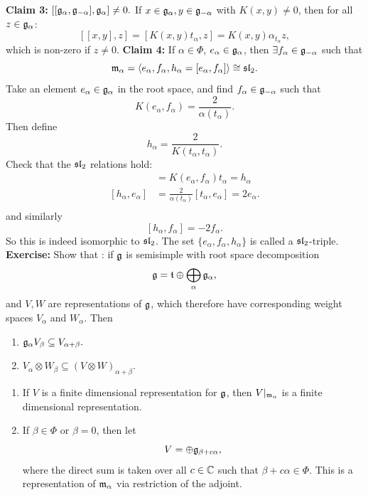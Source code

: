 \documentclass{article}
\begin{document}
\textbf{Claim 3:} $[[\mathfrak{g}_{\alpha},\mathfrak{g}_{-\alpha}],\mathfrak{g}_{\alpha}] \neq 0.$ \gap 
If $x \in \mathfrak{g}_{\alpha}, y \in \mathfrak{g}_{-\alpha}$ with $K(x,y) \neq 0$, then for all $z \in \mathfrak{g}_{\alpha}$: \[ [[x,y],z] = [K(x,y)t_{\alpha},z] = K(x,y)\alpha_{t_{\alpha}}z, \] which is non-zero if $z \neq 0$.\gap
\textbf{Claim 4: } \newlec If $\alpha \in \Phi$, $e_{\alpha} \in \mathfrak{g}_{\alpha}$, then $\exists f_{\alpha} \in \mathfrak{g}_{-\alpha}$ such that \[ \mathfrak{m}_{\alpha} = \langle e_{\alpha}, f_{\alpha},h_{\alpha} = [e_{\alpha}, f_{\alpha}] \rangle \cong \mathfrak{sl}_{2}.\] Take an element $e_{\alpha} \in \mathfrak{g}_{\alpha}$ in the root space, and find $f_{\alpha} \in \mathfrak{g}_{-\alpha}$ such that \[ K(e_{\alpha},f_{\alpha}) = \frac{2}{\alpha(t_{\alpha})}.\] Then define \[ h_{\alpha} = \frac{2}{K(t_{\alpha},t_{\alpha})}.\] Check that the $\mathfrak{sl}_{2}$ relations hold: \begin{align*}
    [e_{\alpha},f_{\alpha}] &= K(e_\alpha , f_\alpha )t_\alpha = h_\alpha\\
    [h_{\alpha},e_{\alpha}] &= \frac{2}{\alpha(t_{\alpha})}[t_{\alpha},e_{\alpha}] = 2e_{\alpha}.\\
\end{align*}
and similarly \[ [h_{\alpha},f_{\alpha}] = -2f_{\alpha}. \] So this is indeed isomorphic to $\mathfrak{sl}_{2}$. The set $\{e_{\alpha},f_{\alpha},h_{\alpha}\}$ is called a $\mathfrak{sl}_{2}$-triple. \gap 
\textbf{Exercise: } Show that : if $\mathfrak{g}$ is semisimple with root space decomposition \[ \mathfrak{g} = \mathfrak{t} \oplus \bigoplus_{\alpha} \mathfrak{g}_{\alpha}, \] and $V,W$ are representations of $\mathfrak{g}$, which therefore have corresponding weight spaces $V_{\alpha}$ and $W_{\alpha}$. Then \begin{enumerate}
    \item $\mathfrak{g}_{\alpha} V_{\beta} \subseteq V_{\alpha +\beta}.$
    \item  $V_{\alpha} \otimes W_{\beta} \subseteq (V \otimes W)_{\alpha + \beta}.$
\end{enumerate}
\begin{fancylem}{}\hspace{0.1cm}
    \begin{enumerate}
        \item If $V$ is a finite dimensional representation for $\mathfrak{g}$, then $V|_{\mathfrak{m}_{\alpha}}$ is a finite dimensional representation.
        \item If $\beta \in \Phi$ or $\beta = 0$, then let \[ V = \oplus \mathfrak{g}_{\beta + c \alpha},\] where the direct sum is taken over all $c \in \mathbb{C}$ such that $\beta + c \alpha \in \Phi$. This is a representation of $\mathfrak{m}_{\alpha}$ via restriction of the adjoint.
    \end{enumerate}
\end{fancylem}
\end{document}
